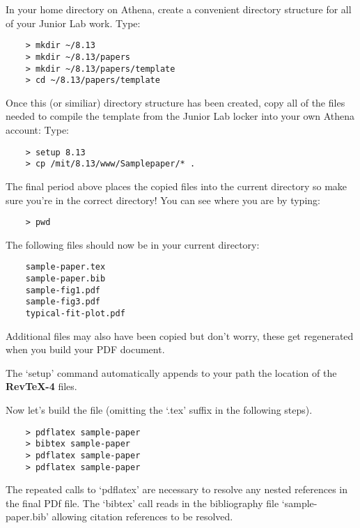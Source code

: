     In your home directory on Athena, create a convenient directory structure for all of your Junior Lab
    work. Type:
    \begin{verbatim}
    > mkdir ~/8.13
    > mkdir ~/8.13/papers
    > mkdir ~/8.13/papers/template
    > cd ~/8.13/papers/template
    \end{verbatim}
    Once this (or similiar) directory structure has been created, copy all
    of the files needed to compile the template from the Junior Lab locker
    into your own Athena account: Type: 
    \begin{verbatim}
    > setup 8.13
    > cp /mit/8.13/www/Samplepaper/* .  
    \end{verbatim}
    The final period above places the
    copied files into the current directory so make sure you're in the
    correct directory!  You can see where you are by typing:
    \begin{verbatim}
    > pwd
    \end{verbatim}
    The following files should now be in
    your current directory: 
    \begin{verbatim}
    sample-paper.tex
    sample-paper.bib
    sample-fig1.pdf 
    sample-fig3.pdf 
    typical-fit-plot.pdf
    \end{verbatim}
    Additional files may also have been copied but don't worry, these get
    regenerated when you build your PDF document.
    
    The `setup' command automatically
    appends to your path the location of the {\bf RevTeX-4} files.
    
    Now let's build the file (omitting the `.tex' suffix in the following steps).  
    
    
    
    \begin{verbatim}
    > pdflatex sample-paper
    > bibtex sample-paper
    > pdflatex sample-paper
    > pdflatex sample-paper
    \end{verbatim}
    
    
    The repeated calls to `pdflatex' are necessary to resolve any nested
    references in the final PDf file.  The `bibtex' call reads in the
    bibliography file `sample-paper.bib' allowing citation references to
    be resolved.
    
